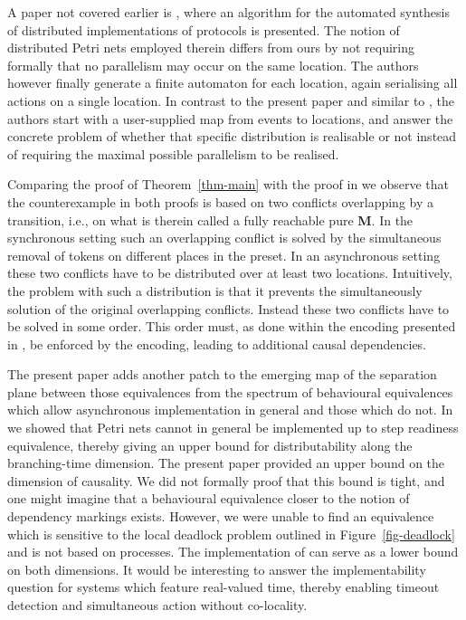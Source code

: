 \documentclass[submission,copyright,creativecommons]{eptcs}
\theoremstyle{definition}
\def\theoremname{Theorem}
\newcommand{\refthm}[1]{\theoremname~\ref{thm-#1}}
\def\figurename{Figure}
\newcommand{\reffig}[1]{\figurename~\ref{fig-#1}}
\begin{document}
A paper not covered earlier is \cite{badouel02distributing}, where an algorithm for the
automated synthesis of distributed implementations of protocols is presented.
The notion of distributed Petri nets employed therein differs from ours by not
requiring formally that no parallelism may occur on the same location. The authors
however finally generate a finite automaton for each location, again serialising all
actions on a single location. In contrast to the present paper and similar to
\cite{hopkins91distnets}, the authors start with a user-supplied map from
events to locations, and answer the concrete problem of whether that specific
distribution is realisable or not instead of requiring the maximal possible
parallelism to be realised.

Comparing the proof of \refthm{main} with the proof in
\cite{glabbeek08syncasyncinteraction} we observe that the counterexample in
both proofs is based on two conflicts overlapping by a transition, i.e., on what is
therein called a
fully reachable pure \textbf{M}. In the synchronous setting such an overlapping
conflict is solved by the simultaneous removal of tokens on different places in
the preset. In an asynchronous setting these two conflicts have to be
distributed over at least two locations. Intuitively, the problem with such a
distribution is that it prevents the simultaneously solution of the original
overlapping conflicts. Instead these two conflicts have to be solved
in some order. This order must, as done within the encoding presented in
\cite{schicke09synchrony}, be enforced by the encoding,
leading to additional causal dependencies.

The present paper adds another patch to the emerging map of the separation plane
between those equivalences from the spectrum of behavioural equivalences which allow
asynchronous implementation in general and those which do not.
In \cite{glabbeek08syncasyncinteraction} we showed that Petri nets cannot in general be
implemented up to step readiness equivalence, thereby giving an upper bound for distributability
along the branching-time dimension. The present paper provided an upper bound on
the dimension of causality.
We did not formally proof that this bound is tight, and one might imagine that a
behavioural equivalence closer to the notion of dependency markings exists. However,
we were unable to find an equivalence which is sensitive to the local deadlock
problem outlined in \reffig{deadlock} and is not based on processes.
The implementation of \cite{schicke09synchrony} can
serve as a lower bound on both dimensions.
It would be interesting to answer
the implementability question for systems which feature real-valued time, thereby
enabling timeout detection and simultaneous action without co-locality.
\end{document}

